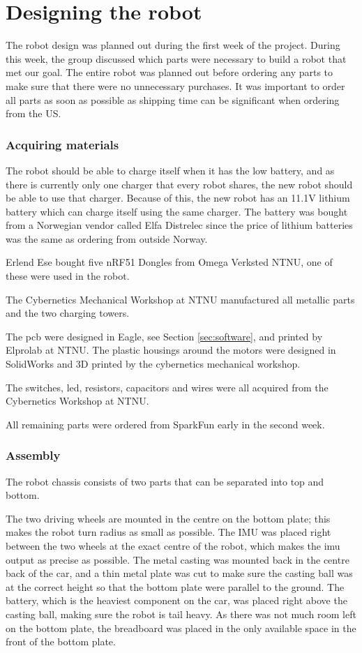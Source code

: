 \section{Designing the robot}
The robot design was planned out during the first week of the project. During this week, the group discussed which parts were necessary to build a robot that met our goal. The entire robot was planned out before ordering any parts to make sure that there were no unnecessary purchases. It was important to order all parts as soon as possible as shipping time can be significant when ordering from the US.

\subsubsection{Acquiring materials}
The robot should be able to charge itself when it has the low battery, and as there is currently only one charger that every robot shares, the new robot should be able to use that charger. Because of this, the new robot has an 11.1V lithium battery which can charge itself using the same charger. The battery was bought from a Norwegian vendor called Elfa Distrelec\cite{elfa} since the price of lithium batteries was the same as ordering from outside Norway.

Erlend Ese bought five nRF51 Dongles from Omega Verksted NTNU, one of these were used in the robot.

The Cybernetics Mechanical Workshop at NTNU manufactured all metallic parts and the two charging towers.

The \acrshort{pcb} were designed in Eagle, see Section \ref{sec:software}, and printed by Elprolab\cite{elprolab} at NTNU. The plastic housings around the motors were designed in SolidWorks and 3D printed by the cybernetics mechanical workshop.

The switches, \acrfull{led}, resistors, capacitors and wires were all acquired from the Cybernetics Workshop at NTNU.

All remaining parts were ordered from SparkFun early in the second week.


\subsubsection{Assembly}
The robot chassis consists of two parts that can be separated into top and bottom.

The two driving wheels are mounted in the centre on the bottom plate; this makes the robot turn radius as small as possible. The IMU was placed right between the two wheels at the exact centre of the robot, which makes the \acrshort{imu} output as precise as possible. The metal casting was mounted back in the centre back of the car, and a thin metal plate was cut to make sure the casting ball was at the correct height so that the bottom plate were parallel to the ground. The battery, which is the heaviest component on the car, was placed right above the casting ball, making sure the robot is tail heavy. As there was not much room left on the bottom plate, the breadboard was placed in the only available space in the front of the bottom plate.

